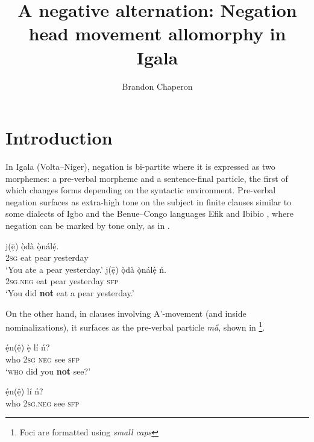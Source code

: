 \documentclass[output=paper,colorlinks,citecolor=brown,
]{langscibook}
\author{Brandon Chaperon\affiliation{McGill University}}
\title{A negative alternation: Negation head movement allomorphy in Igala}
\begin{document}
\maketitle

\section{Introduction}

In Igala (Volta–Niger), negation is bi-partite where it is expressed as two morphemes: a pre-verbal morpheme and a sentence-final particle, the first of which changes forms depending on the syntactic environment. %
Pre-verbal negation surfaces as extra-high tone on the subject in finite clauses similar to some dialects of Igbo \citep{emenanjo1985auxiliaries,ndimele1995phonosyntactic, obiamalu2013role} and the Benue–Congo languages Efik \citep{mensah2001negation} and Ibibio \citep{essien1990grammar}, where negation can be marked by tone only, as in .

\ea \label{ex:chaperon:neutralneg}
\begin{xlist} 
    \ex %
    \gll {} j(\={ẹ}) \`{ọ}d\`{a}  \`{ọ}n\'{a}l\'{ẹ}.\\
        \textsc{2sg}     eat    pear     yesterday\\
        \glt `You ate a pear yesterday.'
    \ex %
    \gll {} j(\={ẹ}) \`{ọ}d\`{a}  \`{ọ}n\'{a}l\'{ẹ} \'{n}.\\
        \textsc{2sg}.\textsc{neg}     eat    pear     yesterday     \textsc{sfp}\\
        \glt `You did \textbf{not} eat a pear yesterday.'
\end{xlist}
\z

On the other hand, in clauses involving A'-movement (and inside nominalizations), it surfaces as the pre-verbal particle \textit{m\H{a}}, shown in \footnote{Foci are formatted using \textit{small caps}}.

\ea \label{ex:chaperon:extrneg}
\begin{xlist}
\ex\gll\'{ẹ}n(\^{ẹ}) \`{ẹ}  l\'{i}  \'{n}?\\
        who     \textsc{2sg}     \textsc{neg}     see  {}   \textsc{sfp}\\
    \glt `\textsc{who} did you \textbf{not} see?'
    
    \ex %
    \gll {*} \'{ẹ}n(\^{ẹ})  l\'{i}  \'{n}?\\
        { } who     \textsc{2sg.neg}      see  {}   \textsc{sfp}\\

\end{xlist}
\z 
\end{document}
